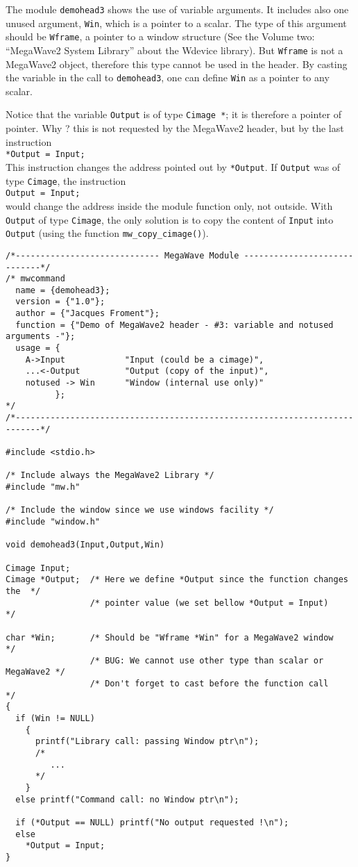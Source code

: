 The module \verb+demohead3+ shows the use of variable arguments.
It includes also one unused argument, \verb+Win+, which is a pointer to a 
scalar.
The type of this argument should be \verb+Wframe+, a pointer to a window structure
(See the Volume two: ``MegaWave2 System Library'' about the Wdevice library).
But \verb+Wframe+ is not a MegaWave2 object, therefore this type cannot be
used in the header. By casting the variable in the call to \verb+demohead3+, one can define \verb+Win+ as a pointer to any scalar.

Notice that the variable \verb+Output+ is of type \verb+Cimage *+; it is therefore
a pointer of pointer.
Why ? this is not requested by the MegaWave2 header, but by the last instruction \\
\verb+*Output = Input;+ \\
This instruction changes the address pointed out by \verb+*Output+.
If \verb+Output+ was of type \verb+Cimage+, the instruction \\
\verb+Output = Input;+ \\
would change the address inside the module function only, not outside.
With \verb+Output+ of type \verb+Cimage+,  the only solution is to copy the
content of \verb+Input+ into \verb+Output+ (using the function \verb+mw_copy_cimage()+).

{\small
\begin{verbatim} 
/*----------------------------- MegaWave Module -----------------------------*/
/* mwcommand
  name = {demohead3};
  version = {"1.0"};
  author = {"Jacques Froment"};
  function = {"Demo of MegaWave2 header - #3: variable and notused arguments -"};
  usage = {
    A->Input            "Input (could be a cimage)",
    ...<-Output         "Output (copy of the input)",
    notused -> Win      "Window (internal use only)" 
          };
*/
/*---------------------------------------------------------------------------*/

#include <stdio.h>

/* Include always the MegaWave2 Library */
#include "mw.h"

/* Include the window since we use windows facility */
#include "window.h" 

void demohead3(Input,Output,Win)

Cimage Input;
Cimage *Output;  /* Here we define *Output since the function changes the  */
                 /* pointer value (we set bellow *Output = Input)          */

char *Win;       /* Should be "Wframe *Win" for a MegaWave2 window         */
                 /* BUG: We cannot use other type than scalar or MegaWave2 */
                 /* Don't forget to cast before the function call          */
{
  if (Win != NULL)
    {
      printf("Library call: passing Window ptr\n");
      /*
         ...
      */
    }
  else printf("Command call: no Window ptr\n");

  if (*Output == NULL) printf("No output requested !\n");
  else 
    *Output = Input;  
}
\end{verbatim} 
}


